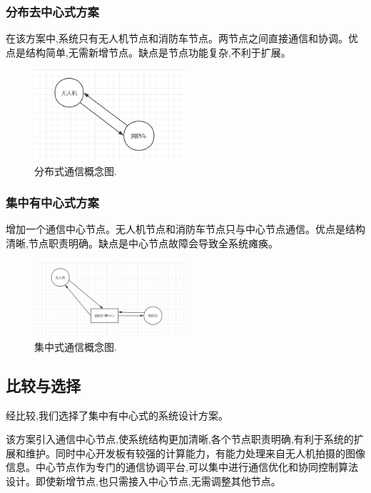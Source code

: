 \documentclass[12pt, a4paper, oneside]{article}
\begin{document}
\subsubsection{分布去中心式方案}

在该方案中,系统只有无人机节点和消防车节点。两节点之间直接通信和协调。优点是结构简单,无需新增节点。缺点是节点功能复杂,不利于扩展。

\begin{figure}[H]
    \centering
    \includegraphics[width=0.5\textwidth]{image-6.png}
    \caption{分布式通信概念图.}
    \label{分布式通信概念图}
\end{figure}


\subsubsection{集中有中心式方案}

增加一个通信中心节点。无人机节点和消防车节点只与中心节点通信。优点是结构清晰,节点职责明确。缺点是中心节点故障会导致全系统瘫痪。

\begin{figure}[H]
    \centering
    \includegraphics[width=0.5\textwidth]{image-7.png}
    \caption{集中式通信概念图.}
    \label{集中式通信概念图}
\end{figure}


\subsection{比较与选择}

经比较,我们选择了集中有中心式的系统设计方案。

该方案引入通信中心节点,使系统结构更加清晰,各个节点职责明确,有利于系统的扩展和维护。同时中心开发板有较强的计算能力，有能力处理来自无人机拍摄的图像信息。中心节点作为专门的通信协调平台,可以集中进行通信优化和协同控制算法设计。即使新增节点,也只需接入中心节点,无需调整其他节点。
\end{document}
